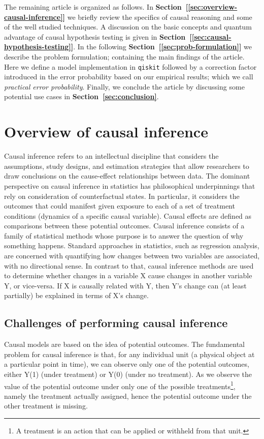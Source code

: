 \documentclass[
 aps,
 jmp,
 amsmath,amssymb,
 reprint,
]{revtex4-2}
\begin{document}
The remaining article is organized as follows. 
In \textbf{Section~[\ref{sec:overview-causal-inference}]} we briefly review the specifics of causal reasoning and some of the well studied techniques. A discussion on the basic concepts and quantum advantage of causal hypothesis testing is given in
\textbf{Section~[\ref{sec:causal-hypothesis-testing}]}. In the following \textbf{Section~[\ref{sec:prob-formulation}]} we describe the problem formulation; containing the main findings of the article. Here we define a model implementation in \texttt{qiskit} followed by a correction factor introduced in the error probability based on our empirical results; which we call \textit{practical error probability}. Finally, we conclude the article by discussing some potential use cases in \textbf{Section~\ref{sec:conclusion}}.
\section{\label{sec:overview-causal-inference}Overview of causal inference}

Causal inference refers to an intellectual discipline that considers the assumptions, study designs, and estimation strategies that allow researchers to draw conclusions on the cause-effect relationships between data. 
The dominant perspective on causal inference in statistics has philosophical underpinnings that rely on consideration of counterfactual states. 
In particular, it considers the outcomes that could manifest given exposure to each of a set of treatment conditions (dynamics of a specific causal variable). 
Causal effects are defined as comparisons between these potential outcomes. 
Causal inference consists of a family of statistical methods whose purpose is to answer the question of why something happens. 
Standard approaches in statistics, such as regression analysis, are concerned with quantifying how changes between two variables are associated, with no directional sense. 
In contrast to that, causal inference methods are used to determine whether changes in a variable X cause changes in another variable Y, or vice-versa.  
If X is causally related with Y, then Y's change can (at least partially) be explained in terms of X's change.

\subsection{Challenges of performing causal inference}

Causal models are based on the idea of potential outcomes. 
The fundamental problem for causal inference is that, for any individual unit (a physical object at a particular point in time), we can observe only one of the potential outcomes, either Y(1) (under treatment) or Y(0) (under no treatment). 
As we observe the value of the potential outcome under only one of the possible treatments\footnote{A treatment is an action that can be applied or withheld from that unit.}, namely the treatment actually assigned, hence the potential outcome under the other treatment is missing.
\end{document}
